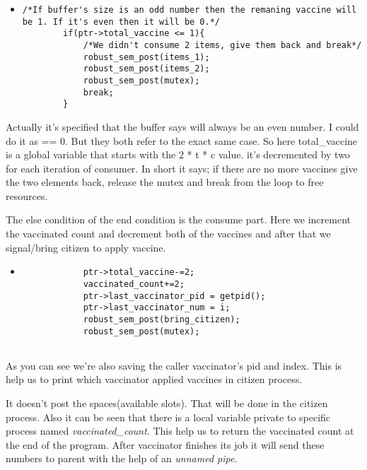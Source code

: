 \documentclass{article}
\begin{document}
\begin{itemize}
\begin{itemize}
    \item 
    \begin{lstlisting}
/*If buffer's size is an odd number then the remaning vaccine will be 1. If it's even then it will be 0.*/
        if(ptr->total_vaccine <= 1){
            /*We didn't consume 2 items, give them back and break*/
            robust_sem_post(items_1);
            robust_sem_post(items_2);
            robust_sem_post(mutex);
            break;
        }      
    \end{lstlisting}
\end{itemize}

\quad Actually it's specified that the buffer says will always be an even number. I could do it as == 0. But they both refer to the exact same case. So here total\_vaccine is a global variable that starts with the 2 * t * c value. it's decremented by two for each iteration of consumer. In short it says; if there are no more vaccines give the two elements back, release the mutex and break from the loop to free resources.

\quad The else condition of the end condition is the consume part. Here we increment the vaccinated count and decrement both of the vaccines and after that we signal/bring citizen to apply vaccine.

\begin{itemize}
    \item 
    \begin{lstlisting}
            ptr->total_vaccine-=2;
            vaccinated_count+=2;
            ptr->last_vaccinator_pid = getpid();
            ptr->last_vaccinator_num = i;
            robust_sem_post(bring_citizen);
            robust_sem_post(mutex);
            
    \end{lstlisting}
\end{itemize}

As you can see we're also saving the caller vaccinator's pid and index. This is help us to print which vaccinator applied vaccines in citizen process. 

\quad It doesn't post the spaces(available slots). That will be done in the citizen process. Also it can be seen that there is a local variable private to specific process named \textit{vaccinated\_count}. This help us to return the vaccinated count at the end of the program. After vaccinator finishes its job it will send these numbers to parent with the help of an \textit{unnamed pipe}. 



\end{itemize}
\end{document}
